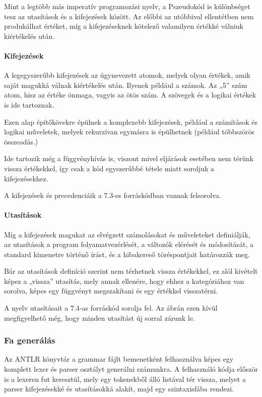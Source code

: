 Mint a legtöbb más imperatív programozási nyelv, a Pszeudokód is különbséget tesz az utasítások és a kifejezések között. Az előbbi az utóbbival ellentétben nem produkálhat értéket, míg a kifejezéseknek kötelező valamilyen értékké válniuk kiértékelés után.

\paragraph{Kifejezések}

A legegyszerűbb kifejezések az úgynevezett atomok, melyek olyan értékek, amik saját magukká válnak kiértékelés után. Ilyenek például a számok. Az „5” szám atom, hisz az értéke önmaga, vagyis az ötös szám. A szövegek és a logikai értékek is ide tartoznak.

Ezen alap építőkövekre épülnek a komplexebb kifejezések, például a számítások és logikai műveletek, melyek rekurzívan egymásra is épülhetnek (például többszörös összeadás.) 

Ide tartozik még a függvényhívás is, viszont mivel eljárások esetében nem térünk vissza értékekkel, így csak a kód egyszerűbbé tétele miatt soroljuk a kifejezésekhez.

A kifejezések és precedenciáik a 7.3-es forráskódban vannak felsorolva.

\paragraph{Utasítások}

Míg a kifejezések magukat az elvégzett számolásokat és műveleteket definiálják, az utasítások a program folyamatvezérlését, a változók elérését és módosítását, a standard kimenetre történő írást, és a hibakereső töréspontjait határozzák meg.

Bár az utasítások definíció szerint nem térhetnek vissza értékekkel, ez alól kivételt képez a „vissza” utasítás, mely annak ellenére, hogy ehhez a kategóriához van sorolva, képes egy függvényt megszakítani és egy értékkel visszatérni.

A nyelv utasításait a 7.4-as forráskód sorolja fel. Az ábrán ezen kívül megfigyelhető még, hogy minden utasítást új sorral zárunk le.

\subsubsection{Fa generálás}

Az ANTLR könyvtár a grammar fájlt bemenetként felhasználva képes egy komplett lexer és parser osztályt generálni számunkra. A felhasználó kódja először is a lexeren fut keresztül, mely egy tokenekből álló listával tér vissza, melyet a parser kifejezésekké és utasításokká alakít, majd egy szintaxisfába rendezi.



